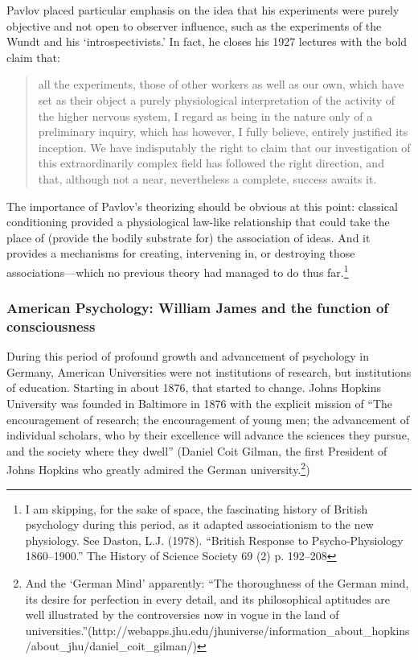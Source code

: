 Pavlov placed particular emphasis on the idea that his experiments were purely objective and not open to observer influence, such as the experiments of the Wundt and his ‘introspectivists.’ In fact, he closes his 1927 lectures with the bold claim that:

\begin{quote}

all the experiments, those of other workers as well as our own, which have set as their object a purely physiological interpretation of the activity of the higher nervous system, I regard as being in the nature only of a preliminary inquiry, which has however, I fully believe, entirely justified its inception. We have indisputably the right to claim that our investigation of this extraordinarily complex field has followed the right direction, and that, although not a near, nevertheless a complete, success awaits it.
\end{quote}

The importance of Pavlov's theorizing should be obvious at this point: classical conditioning provided a physiological law-like relationship that could take the place of (provide the bodily substrate for) the association of ideas. And it provides a mechanisms for creating, intervening in, or destroying those associations—which no previous theory had managed to do thus far.\footnote{I am skipping, for the sake of space, the fascinating history of British psychology during this period, as it adapted associationism to the new physiology. See Daston, L.J. (1978). “British Response to Psycho-Physiology 1860--1900.” The History of Science Society 69 (2) p. 192--208}

\subsubsection{American Psychology: William James and the function of consciousness}
\label{americanpsychology:williamjamesandthefunctionofconsciousness}

During this period of profound growth and advancement of psychology in Germany, American Universities were not institutions of research, but institutions of education. Starting in about 1876, that started to change. Johns Hopkins University was founded in Baltimore in 1876 with the explicit mission of ``The encouragement of research; the encouragement of young men; the advancement of individual scholars, who by their excellence will advance the sciences they pursue, and the society where they dwell'' (Daniel Coit Gilman, the first President of Johns Hopkins who greatly admired the German university.\footnote{And the ‘German Mind’ apparently: “The thoroughness of the German mind, its desire for perfection in every detail, and its philosophical aptitudes are well illustrated by the controversies now in vogue in the land of universities.”(http:\slash \slash webapps.jhu.edu\slash jhuniverse\slash information\_about\_hopkins\slash about\_jhu\slash daniel\_coit\_gilman\slash )})

